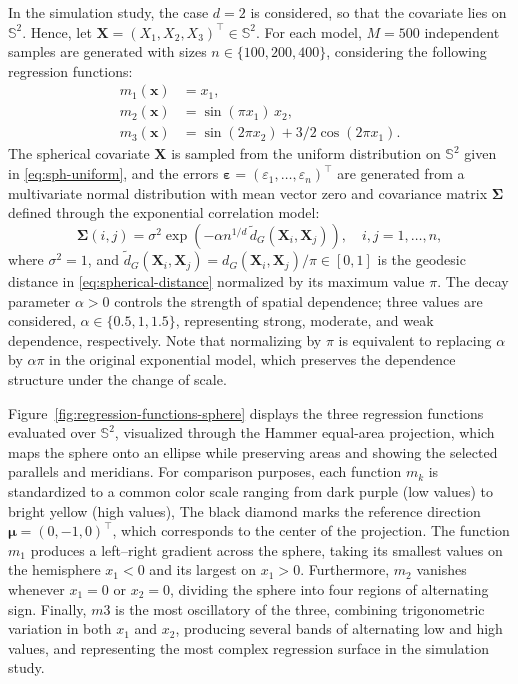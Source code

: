 \documentclass[12pt]{report} %
\newcommand{\bX}{\mathbf{X}}
\newcommand{\bx}{\mathbf{x}}
\newcommand{\bmu}{\boldsymbol{\mu}}
\newcommand{\bSigma}{\boldsymbol\Sigma}
\begin{document}
In the simulation study, the case $d = 2$ is considered, so that the covariate lies on $\mathbb{S}^2$. Hence, let $\bX = (X_1, X_2, X_3)^\top \in \mathbb{S}^2$. For each model, $M=500$ independent samples are generated with sizes $n \in \{100, 200, 400\}$, considering the following regression functions:
\begin{align}
    m_1(\bx) &= x_{1},
    \label{eq:regression-function-m1} \\
    m_2(\bx) &= \sin(\pi x_{1}) \, x_{2},
    \label{eq:regression-function-m2} \\
    m_3(\bx) &= \sin(2\pi x_{2}) + 3/2\cos(2\pi x_{1}).
    \label{eq:regression-function-m3}
\end{align}
The spherical covariate $\bX$ is sampled from the uniform distribution on $\mathbb{S}^2$ given in \eqref{eq:sph-uniform}, and the errors $\boldsymbol{\varepsilon} = (\varepsilon_1, \ldots, \varepsilon_n)^\top$ are generated from a multivariate normal distribution with mean vector zero and covariance matrix $\bSigma$ defined through the exponential correlation model:
\begin{equation}
    \label{eq:corr-sim}
    \bSigma(i,j) = \sigma^2 \exp\!\left(-\alpha n^{1/d}\,\tilde{d}_{G}(\bX_i, \bX_j)\right), 
    \quad i,j = 1,\ldots,n,
\end{equation}
where $\sigma^2=1$, and $\tilde{d}_{G}(\bX_i,\bX_j)=d_{G}(\bX_i,\bX_j)/\pi\in[0,1]$ is the geodesic distance in \eqref{eq:spherical-distance} normalized by its maximum value $\pi$. The decay parameter $\alpha>0$ controls the strength of spatial dependence; three values are considered, $\alpha\in\{0.5,1,1.5\}$, representing strong, moderate, and weak dependence, respectively. Note that normalizing by $\pi$ is equivalent to replacing $\alpha$ by $\alpha\pi$ in the original exponential model, which preserves the dependence structure under the change of scale.


Figure~\ref{fig:regression-functions-sphere} displays the three regression functions evaluated over $\mathbb{S}^2$, visualized through the Hammer equal-area projection, which maps the sphere onto an ellipse while preserving areas and showing the selected parallels and meridians. For comparison purposes, each function $m_k$ is standardized  to a common color scale ranging from dark purple (low values) to bright yellow (high values), The black diamond marks the reference direction $\bmu = (0, -1, 0)^\top$, which corresponds to the center of the projection. The function $m_1$ produces a left--right gradient across the sphere, taking its smallest values on the hemisphere $x_1 < 0$ and its largest on $x_1 > 0$. Furthermore, $m_2$ vanishes whenever $x_1 = 0$ or $x_2 = 0$, dividing the sphere into four regions of alternating sign. Finally, $m3$ is the most oscillatory of the three, combining trigonometric variation in both $x_1$ and $x_2$, producing several bands of alternating low and high values, and representing the most complex 
regression surface in the simulation study.
\end{document}
